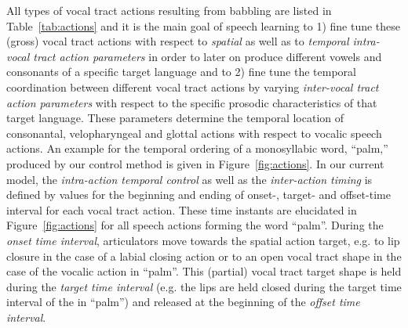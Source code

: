 \documentclass[conference]{IEEEtran}
\let\ipa\textipa
\begin{document}
All types of vocal tract actions resulting from babbling are listed in
Table~\ref{tab:actions} and it is the main goal of speech learning
to 1) fine tune these (gross) vocal tract actions with respect to
\textit{spatial} as well as to \textit{temporal intra-vocal tract
  action parameters} in order to later on produce
different vowels and consonants of a specific target language and to
2) fine tune the temporal coordination between different vocal tract
actions by varying \textit{inter-vocal tract action parameters} with
respect to the specific prosodic characteristics of that target
language. These parameters determine the temporal location of
consonantal, velopharyngeal and glottal actions with respect to
vocalic speech actions. An example for the temporal ordering of a
monosyllabic word, ``palm,'' produced by our control method is given in
Figure~\ref{fig:actions}. In our current model, the
\textit{intra-action temporal control} as well as the
\textit{inter-action timing} is defined by values for the beginning
and ending of onset-, target- and offset-time interval for each vocal
tract action. These time instants are elucidated in
Figure~\ref{fig:actions} for all speech actions forming the word
``palm''. During the \textit{onset time interval}, articulators move
towards the spatial action target, e.g. to lip closure in the case of a
labial closing action or to an open vocal tract shape in the case of the
vocalic action in ``palm''. This (partial) vocal tract target shape is
held during the \textit{target time interval}
(e.g. the lips are held closed during
the target time interval of the \ipa{[p]} in ``palm'')
and released at the beginning of the \textit{offset time interval}.
\end{document}
